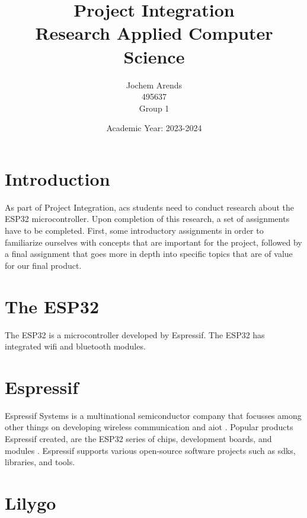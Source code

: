 \documentclass{article}
\title{Project Integration \\ Research Applied Computer Science}
\author{Jochem Arends \\ 495637 \\ Group 1}
\date{Academic Year: 2023-2024}
\begin{document}
\maketitle
\newpage

\tableofcontents
\clearpage

\printglossary[type=\acronymtype,{title=Abbreviations}]
\printglossary[type=main]


\clearpage

\section{Introduction}
As part of Project Integration, \gls{acs} students need to conduct research about the ESP32 microcontroller.
Upon completion of this research, a set of assignments have to be completed.
First, some introductory assignments in order to familiarize ourselves with concepts that are important for the project, followed by a final assignment that goes more in depth into specific topics that are of value for our final product.

\section{The ESP32}
The ESP32 is a microcontroller developed by Espressif.
The ESP32 has integrated \gls{wifi} and \gls{bluetooth} modules.

\section{Espressif}
Espressif Systems is a multinational semiconductor company that focusses among other things on developing wireless communication and \gls{aiot} \cite{aboutespressif}.
Popular products Espressif created, are the ESP32 series of chips, development boards, and modules \cite{aboutespressif}.
Espressif supports various open-source software projects such as \glspl{sdk}, libraries, and tools.

\section {Lilygo}


\clearpage





\end{document}
